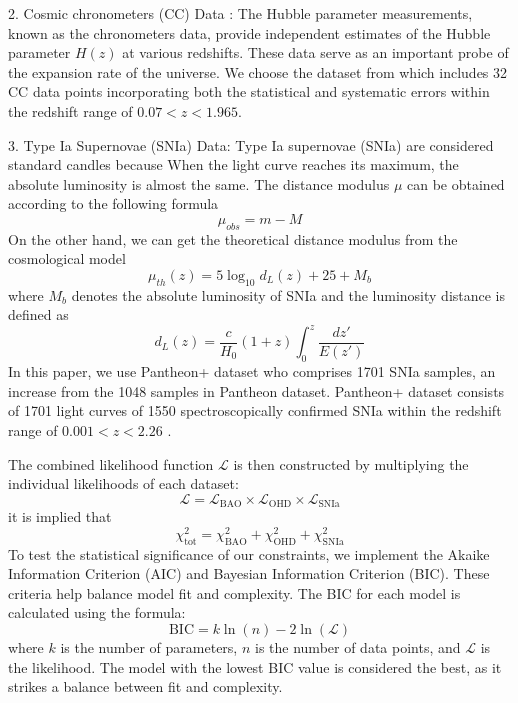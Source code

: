\documentclass[a4paper,fleqn]{cas-sc}
\begin{document}
2. Cosmic chronometers (CC) Data : The Hubble parameter measurements, known as the chronometers data, provide independent estimates of the Hubble parameter $H(z)$ at various redshifts. These data serve as an important probe of the expansion rate of the universe. We choose the dataset from \cite{Favale_2023} which includes 32 CC data points incorporating both the statistical and systematic errors within the redshift range of $0.07 < z < 1.965$.

3. Type Ia Supernovae (SNIa) Data: Type Ia supernovae (SNIa) are considered standard candles because When the light curve reaches its maximum, the absolute luminosity is almost the same. The distance modulus $\mu$ can be obtained according to the following formula
\begin{equation}
    \mu_{obs}=m-M
\end{equation}
On the other hand, we can get the theoretical distance modulus from the cosmological model
\begin{equation}
    \mu_{th}(z)=5\log_{10}d_L(z)+25+M_b
\end{equation}
where $M_b$ denotes the absolute luminosity of SNIa and the luminosity distance is defined as
\begin{equation}
    d_L(z)=\frac{c}{H_0}(1+z)\int_0^z \frac{dz'}{E(z')}
\end{equation}
In this paper, we use Pantheon+ dataset who comprises 1701 SNIa samples, an increase from the 1048 samples in Pantheon dataset. Pantheon+ dataset consists of 1701 light curves of 1550 spectroscopically confirmed SNIa within the redshift range of $0.001 < z < 2.26$ \cite{Scolnic_2022,Brout_2022}.

The combined likelihood function $\mathcal{L}$ is then constructed by multiplying the individual likelihoods of each dataset:
\begin{equation}
\mathcal{L} = \mathcal{L}_{\text{BAO}} \times \mathcal{L}_{\text{OHD}} \times \mathcal{L}_{\text{SNIa}}
\end{equation}
it is implied that
\begin{equation}
    \chi^2_\text{tot}=\chi^2_{\text{BAO}}+\chi^2_{\text{OHD}} +\chi^2_{\text{SNIa}}
\end{equation}
To test the statistical significance of our constraints, we implement the Akaike Information Criterion (AIC) and Bayesian Information Criterion (BIC). These criteria help balance model fit and complexity. The BIC for each model is calculated using the formula:
\begin{equation}
\text{BIC} = k \ln(n) - 2 \ln(\mathcal{L})
\end{equation}
where $k$ is the number of parameters, $n$ is the number of data points, and $\mathcal{L}$ is the likelihood. The model with the lowest BIC value is considered the best, as it strikes a balance between fit and complexity.
\end{document}

